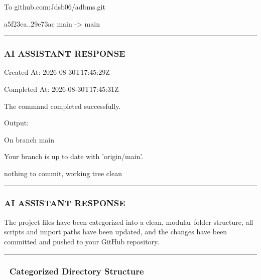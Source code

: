 \documentclass[11pt,a4paper]{article}
\begin{document}
{\begin{itemize}
To github.com:Jdsb06/adbms.git

a5f23ea..29e73ac  main -> main

\end{itemize}

\hrule

\subsubsection{AI ASSISTANT RESPONSE}

Created At: 2026-08-30T17:45:29Z

Completed At: 2026-08-30T17:45:31Z


The command completed successfully.

Output:

On branch main

Your branch is up to date with 'origin/main'.


nothing to commit, working tree clean


\hrule

\subsubsection{AI ASSISTANT RESPONSE}

The project files have been categorized into a clean, modular folder structure, all scripts and import paths have been updated, and the changes have been committed and pushed to your GitHub repository.


\hrule


\subsubsection{📂 Categorized Directory Structure}

}
\end{document}
